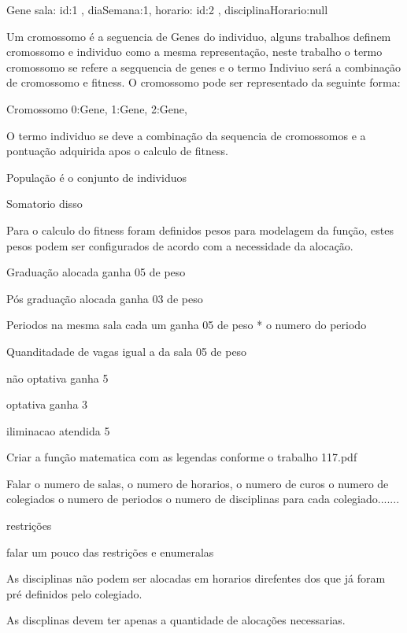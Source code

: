 Gene{
	sala:{
		id:1
	},
	diaSemana:1,
	horario:{
		id:2
	},
	disciplinaHorario:null
}


	Um cromossomo é a seguencia de Genes do individuo, alguns trabalhos definem cromossomo e individuo como a mesma representação, neste trabalho o termo cromossomo se refere a segquencia de genes e o termo Indiviuo será a combinação de cromossomo e fitness. O cromossomo pode ser representado da seguinte forma:

	Cromossomo{
		0:Gene{},
		1:Gene{},
		2:Gene{},
	}


	O termo individuo se deve a combinação da sequencia de cromossomos e a pontuação adquirida apos o calculo de fitness.

	
	População é o conjunto de individuos



Somatorio disso

Para o calculo do fitness foram definidos pesos para modelagem da função, estes pesos podem ser configurados de acordo com a necessidade da alocação.

Graduação alocada ganha 05 de peso

Pós graduação alocada ganha 03 de peso

Periodos na mesma sala cada um ganha 05 de peso * o numero do periodo

Quanditadade de vagas igual a da sala 05 de peso

não optativa ganha 5

optativa ganha 3

iliminacao atendida 5

Criar a função matematica com as legendas conforme o trabalho 117.pdf

Falar o numero de salas, o numero de horarios, o numero de curos o numero de colegiados o numero de periodos o numero de disciplinas para cada colegiado.......

restrições 


falar um pouco das restrições e enumeralas

As disciplinas não podem ser alocadas em horarios direfentes dos que já foram pré definidos pelo colegiado.

As discplinas devem ter apenas a quantidade de alocações necessarias.

